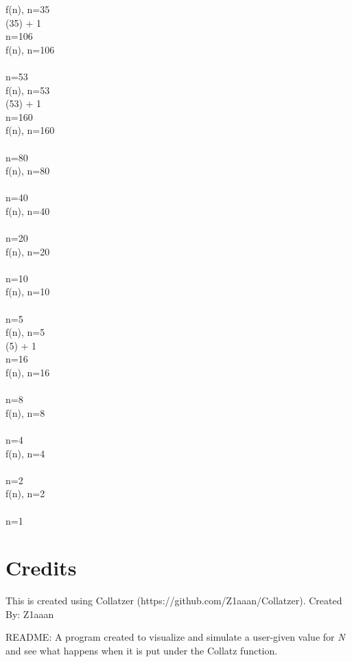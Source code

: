 \documentclass{article}
\begin{document}
f(n), n=35
 \\ 
 (35) + 1
 \\ 
 \Rightarrow n=106
 \\[3mm] 
f(n), n=106
 \\ 
 \Rightarrow {} 
 \\ 
 \Rightarrow n=53
 \\[3mm] 
f(n), n=53
 \\ 
 (53) + 1
 \\ 
 \Rightarrow n=160
 \\[3mm] 
f(n), n=160
 \\ 
 \Rightarrow {} 
 \\ 
 \Rightarrow n=80
 \\[3mm] 
f(n), n=80
 \\ 
 \Rightarrow {} 
 \\ 
 \Rightarrow n=40
 \\[3mm] 
f(n), n=40
 \\ 
 \Rightarrow {} 
 \\ 
 \Rightarrow n=20
 \\[3mm] 
f(n), n=20
 \\ 
 \Rightarrow {} 
 \\ 
 \Rightarrow n=10
 \\[3mm] 
f(n), n=10
 \\ 
 \Rightarrow {} 
 \\ 
 \Rightarrow n=5
 \\[3mm] 
f(n), n=5
 \\ 
 (5) + 1
 \\ 
 \Rightarrow n=16
 \\[3mm] 
f(n), n=16
 \\ 
 \Rightarrow {} 
 \\ 
 \Rightarrow n=8
 \\[3mm] 
f(n), n=8
 \\ 
 \Rightarrow {} 
 \\ 
 \Rightarrow n=4
 \\[3mm] 
f(n), n=4
 \\ 
 \Rightarrow {} 
 \\ 
 \Rightarrow n=2
 \\[3mm] 
f(n), n=2
 \\ 
 \Rightarrow {} 
 \\ 
 \Rightarrow n=1
 \\[3mm] 

    \section{Credits}
    This is created using Collatzer (https://github.com/Z1aaan/Collatzer).
    Created By: Z1aaan
    
    README:
    A program created to visualize and simulate a user-given value for \textit{N} 
    and see what happens when it is put under the Collatz function.
    
\end{document}
